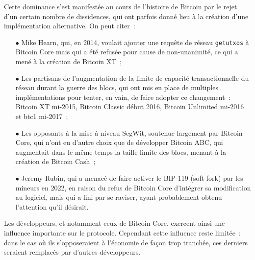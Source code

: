 Cette dominance s'est manifestée au cours de l'histoire de Bitcoin par le rejet d'un certain nombre de dissidences, qui ont parfois donné lieu à la création d'une implémentation alternative. On peut citer~:

\begin{itemize}
\item[$\bullet$] Mike Hearn, qui, en 2014, voulait ajouter une requête de réseau \texttt{getutxos} à Bitcoin Core mais qui a été refusée pour cause de non-unanimité, ce qui a mené à la création de Bitcoin XT~;
\item[$\bullet$] Les partisans de l'augmentation de la limite de capacité transactionnelle du réseau durant la guerre des blocs, qui ont mis en place de multiples implémentations pour tenter, en vain, de faire adopter ce changement~: Bitcoin XT mi-2015, Bitcoin Classic début 2016, Bitcoin Unlimited mi-2016 et btc1 mi-2017~;
\item[$\bullet$] Les opposants à la mise à niveau SegWit, soutenue largement par Bitcoin Core, qui n'ont eu d'autre choix que de développer Bitcoin ABC, qui augmentait dans le même temps la taille limite des blocs, menant à la création de Bitcoin Cash~;
\item[$\bullet$] Jeremy Rubin, qui a menacé de faire activer le BIP-119 (soft fork) par les mineurs en 2022, en raison du refus de Bitcoin Core d'intégrer sa modification au logiciel, mais qui a fini par se raviser, ayant probablement obtenu l'attention qu'il désirait.
\end{itemize}

Les développeurs, et notamment ceux de Bitcoin Core, exercent ainsi une influence importante sur le protocole. Cependant cette influence reste limitée~: dans le cas où ils s'opposeraient à l'économie de façon trop tranchée, ces derniers seraient remplacés par d'autres développeurs.

